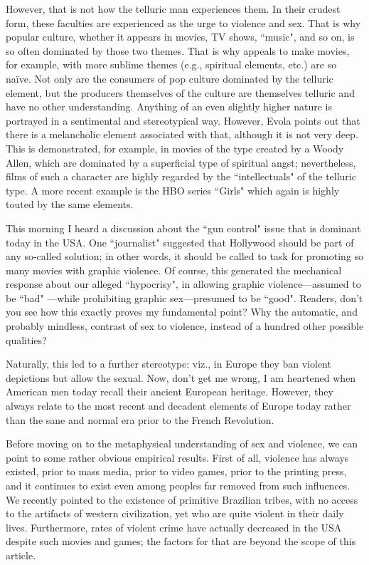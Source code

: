However, that is not how the telluric man experiences them. In their crudest form, these faculties are experienced as the urge to violence and sex. That is why popular culture, whether it appears in movies, TV shows, ``music", and so on, is so often dominated by those two themes. That is why appeals to make movies, for example, with more sublime themes (e.g., spiritual elements, etc.) are so naïve. Not only are the consumers of pop culture dominated by the telluric element, but the producers themselves of the culture are themselves telluric and have no other understanding. Anything of an even slightly higher nature is portrayed in a sentimental and stereotypical way. However, Evola points out that there is a melancholic element associated with that, although it is not very deep. This is demonstrated, for example, in movies of the type created by a Woody Allen, which are dominated by a superficial type of spiritual angst; nevertheless, films of such a character are highly regarded by the ``intellectuals" of the telluric type. A more recent example is the HBO series ``Girls" which again is highly touted by the same elements.

This morning I heard a discussion about the ``gun control" issue that is dominant today in the USA. One ``journalist" suggested that Hollywood should be part of any so-called solution; in other words, it should be called to task for promoting so many movies with graphic violence. Of course, this generated the mechanical response about our alleged ``hypocrisy", in allowing graphic violence—assumed to be ``bad" —while prohibiting graphic sex—presumed to be ``good". Readers, don't you see how this exactly proves my fundamental point? Why the automatic, and probably mindless, contrast of sex to violence, instead of a hundred other possible qualities?

Naturally, this led to a further stereotype: viz., in Europe they ban violent depictions but allow the sexual. Now, don't get me wrong, I am heartened when American men today recall their ancient European heritage. However, they always relate to the most recent and decadent elements of Europe today rather than the sane and normal era prior to the French Revolution.

Before moving on to the metaphysical understanding of sex and violence, we can point to some rather obvious empirical results. First of all, violence has always existed, prior to mass media, prior to video games, prior to the printing press, and it continues to exist even among peoples far removed from such influences. We recently pointed to the existence of primitive Brazilian tribes, with no access to the artifacts of western civilization, yet who are quite violent in their daily lives. Furthermore, rates of violent crime have actually decreased in the USA despite such movies and games; the factors for that are beyond the scope of this article.

